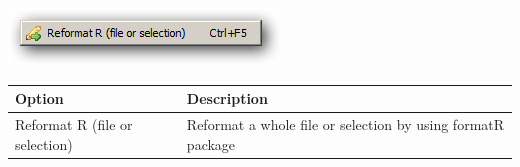 \includegraphics[scale=0.50]{./res/menu_format_reformat.png}


\begin{scriptsize}\begin{tabularx}{\textwidth}{>{\hsize=0.3\hsize}X>{\hsize=0.7\hsize}X}\\
    \hline
    \textbf{Option} & \textbf{Description} \\
    \hline
    Reformat R (file or selection) & Reformat a whole file or selection by using formatR package \\
    \hline
  \end{tabularx}\end{scriptsize}
